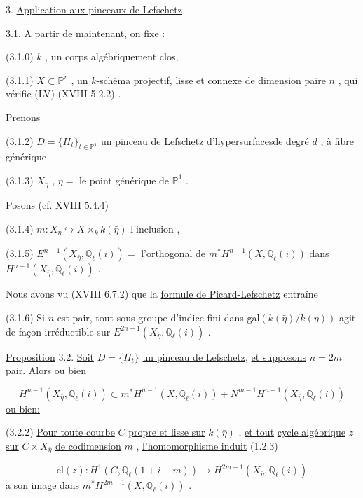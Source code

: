 

3. \underline{Application aux pinceaux de Lefschetz}

3.1. \quad A partir de maintenant, on fixe :

(3.1.0) $k$ , un corps algébriquement clos,

(3.1.1) $X \subset \mathbb{P}^{r}$ , un $k$-schéma projectif, lisse et connexe de dimension paire $n$ , qui vérifie (LV) (XVIII 5.2.2) .

Prenons

(3.1.2) $D = \{H_{t}\}_{t \in \mathbb{P}^{1}}$ un pinceau de Lefschetz d'hypersurfacesde degré $d$ , à fibre générique

(3.1.3) $X_{\eta}$ , $\eta =$ le point générique de $\mathbb{P}^{1}$ .

Posons (cf. XVIII 5.4.4)

(3.1.4) $m : X_{\bar{\eta}} \hookrightarrow X \times_{k} k(\bar{\eta})$ l'inclusion ,

(3.1.5) $E^{n-1}(X_{\bar{\eta}}, \mathbb{Q}_{\ell}(i)) =$ l'orthogonal de $m^{*}H^{n-1}(X,\mathbb{Q}_{\ell}(i))$ dans $H^{n-1}(X_{\bar{\eta}},\mathbb{Q}_{\ell}(i))$ .

Nous avons vu (XVIII 6.7.2) que la \underline{formule de Picard-Lefschetz} entraîne

(3.1.6) Si $n$ est pair, tout sous-groupe d'indice fini dans $\mathrm{gal}(k(\bar{\eta})/k(\eta))$ agit de façon irréductible sur $E^{2n-1}(X_{\bar{\eta}},\mathbb{Q}_{\ell}(i))$ .

\underline{Proposition} 3.2. \quad \underline{Soit} $D = \{H_{t}\}$ \underline{un pinceau de Lefschetz}, \underline{et supposons} $n = 2m$ \underline{pair.} \underline{Alors ou bien} 



\begin{equation}\tag{3.2.1}
 H^{n-1}(X_{\bar{\eta}},\mathbb{Q}_{\ell}(i)) \subset m^{*}H^{n-1}(X,\mathbb{Q}_{\ell}(i)) + N^{m-1}H^{n-1}(X_{\bar{\eta}},\mathbb{Q}_{\ell}(i))
\end{equation}
\underline{ou bien:}

(3.2.2) \underline{Pour toute courbe} $C$ \underline{propre et lisse sur} $k(\bar{\eta})$ , \underline{et tout} \underline{cycle algébrique} $z$ \underline{sur} $C \times X_{\bar{\eta}}$ \underline{de codimension} $m$ , \underline{l'homomorphisme induit} (1.2.3)

\begin{equation}\tag{3.2.3}
\mathrm{cl}(z) : H^{1}(C, \mathbb{Q}_{\ell}(1+i-m)) \longrightarrow H^{2m-1}(X_{\bar{\eta}},\mathbb{Q}_{\ell}(i))
\end{equation}
\underline{a son image dans} $m^{*}H^{2m-1}(X,\mathbb{Q}_{\ell}(i))$ .

